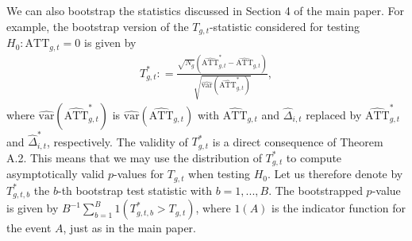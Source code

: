 \documentclass[12pt,fleqn]{article}
\begin{document}
We can also bootstrap the statistics discussed in Section 4 of the main paper. For example, the bootstrap version of the $T_{g,t}$-statistic considered for testing $H_0: \mathrm{ATT}_{g,t} = 0$ is given by
\begin{align}
T_{g,t}^* : = \frac{\sqrt{N_g}(\widehat{\mathrm{ATT}}_{g,t}^*- \widehat{\mathrm{ATT}}_{g,t})}{\sqrt{\widehat{\mathrm{var}}(\widehat{\mathrm{ATT}}_{g,t}^*)}} ,
\end{align}
where $\widehat{\mathrm{var}}(\widehat{\mathrm{ATT}}_{g,t}^*)$ is $\widehat{\mathrm{var}}(\widehat{\mathrm{ATT}}_{g,t})$ with $\widehat{\mathrm{ATT}}_{g,t}$ and $\widehat \Delta_{i,t}$ replaced by $\widehat{\mathrm{ATT}}_{g,t}^*$ and $\widehat \Delta_{i,t}^*$, respectively. The validity of $T_{g,t}^*$ is a direct consequence of Theorem A.2. This means that we may use the distribution of $T_{g,t}^*$ to compute asymptotically valid $p$-values for $T_{g,t}$ when testing $H_0$. Let us therefore denote by $T_{g,t,b}^*$ the $b$-th bootstrap test statistic with $b=1,...,B$. The bootstrapped $p$-value is given by $B^{-1}\sum_{b=1}^B 1(T_{g,t,b}^* > T_{g,t})$, where $1(A)$ is the indicator function for the event $A$, just as in the main paper.


\pagebreak


\end{document}

